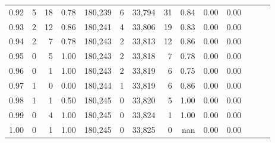 \begin{tabular}{rrrrrrrrrrrrrr}
0.92 &      5 &     18 &  0.78 &  180,239 &        6 &  33,794 &      31 &  0.84 &  0.00 &      0.00 \\
0.93 &      2 &     12 &  0.86 &  180,241 &        4 &  33,806 &      19 &  0.83 &  0.00 &      0.00 \\
0.94 &      2 &      7 &  0.78 &  180,243 &        2 &  33,813 &      12 &  0.86 &  0.00 &      0.00 \\
0.95 &      0 &      5 &  1.00 &  180,243 &        2 &  33,818 &       7 &  0.78 &  0.00 &      0.00 \\
0.96 &      0 &      1 &  1.00 &  180,243 &        2 &  33,819 &       6 &  0.75 &  0.00 &      0.00 \\
0.97 &      1 &      0 &  0.00 &  180,244 &        1 &  33,819 &       6 &  0.86 &  0.00 &      0.00 \\
0.98 &      1 &      1 &  0.50 &  180,245 &        0 &  33,820 &       5 &  1.00 &  0.00 &      0.00 \\
0.99 &      0 &      4 &  1.00 &  180,245 &        0 &  33,824 &       1 &  1.00 &  0.00 &      0.00 \\
1.00 &      0 &      1 &  1.00 &  180,245 &        0 &  33,825 &       0 &   nan &  0.00 &      0.00 \\
\bottomrule
\end{tabular}
